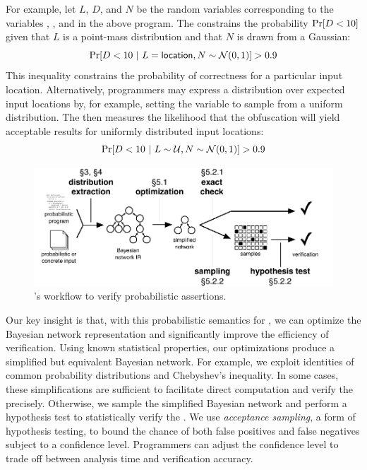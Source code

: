 For example, let $L$,
$D$, and $N$ be the random variables corresponding to the variables
, , and  in the above program.  The
\passert constrains the probability $\Pr\!\left[D < 10\right]$ given that $L$ is
a point-mass distribution and that $N$ is drawn from a Gaussian:
%
$$ \Pr\!\left[D < 10~|~L = \mathsf{location}, N \sim \mathcal{N}(0,1)\right] > 0.9 $$
%
This inequality constrains the probability of correctness for a particular
input location.  Alternatively, programmers may express a distribution
over expected input locations by, for example, setting the
 variable to sample from a uniform distribution. The
\passert then measures the likelihood that the obfuscation will yield
acceptable results for uniformly distributed input locations:
%
$$ \Pr\!\left[D < 10~|~L \sim \mathcal{U}, N \sim \mathcal{N}(0,1)\right] > 0.9 $$

\begin{figure}
    \begin{center}
    \includegraphics[width=\columnwidth]{figs/overview.pdf}
    \end{center}
    \vspace*{-1.0ex}
    \caption{\tool's workflow to verify probabilistic
    assertions.}
    \label{passert:fig:overview}
\end{figure}


Our key insight is that, with this probabilistic semantics for
\passerts, we can optimize the Bayesian network representation and
significantly improve the efficiency of verification.  Using known
statistical properties, our optimizations produce a simplified but
equivalent Bayesian network. For example, we exploit identities of
common probability distributions and Chebyshev's inequality.  In some
cases, these simplifications are sufficient to facilitate direct
computation and verify the \passert precisely. Otherwise, we sample
the simplified Bayesian network and perform a hypothesis test to
statistically verify the \passert. We use
\emph{acceptance sampling}, a form of hypothesis testing, to bound the
chance of both false positives and false negatives subject to a
confidence level.  Programmers can adjust the confidence level to
trade off between analysis time and verification accuracy.


